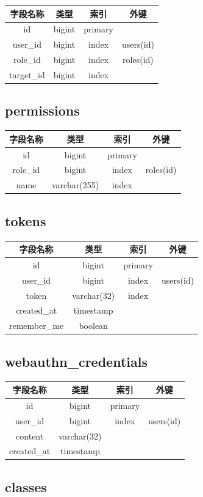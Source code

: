 \documentclass{ctexrep}
\begin{document}
\begin{longtable}[]{@{}cccc@{}}
\toprule
字段名称 & 类型 & 索引 & 外键\tabularnewline
\midrule
id & bigint & primary &\tabularnewline
user_id & bigint & index & users(id)\tabularnewline
role_id & bigint & index & roles(id)\tabularnewline
target_id & bigint & index &\tabularnewline
\bottomrule
\end{longtable}



\hypertarget{permissions}{%
\subsection{permissions}\label{permissions}}



\begin{longtable}[]{@{}cccc@{}}
\toprule
字段名称 & 类型 & 索引 & 外键\tabularnewline
\midrule
id & bigint & primary &\tabularnewline
role_id & bigint & index & roles(id)\tabularnewline
name & varchar(255) & index &\tabularnewline
\bottomrule
\end{longtable}


\subsection{tokens}



\begin{longtable}[]{@{}cccc@{}}
\toprule
字段名称 & 类型 & 索引 & 外键\tabularnewline
\midrule
id & bigint & primary &\tabularnewline
user_id & bigint & index & users(id)\tabularnewline
token & varchar(32) & index &\tabularnewline
created_at & timestamp & &\tabularnewline
remember_me & boolean & &\tabularnewline
\bottomrule
\end{longtable}


\subsection{webauthn_credentials}

\begin{longtable}[]{@{}cccc@{}}
\toprule
字段名称 & 类型 & 索引 & 外键\tabularnewline
\midrule
id & bigint & primary &\tabularnewline
user_id & bigint & index & users(id)\tabularnewline
content & varchar(32) & &\tabularnewline
created_at & timestamp & &\tabularnewline
\bottomrule
\end{longtable}

\subsection{classes}
\end{document}
